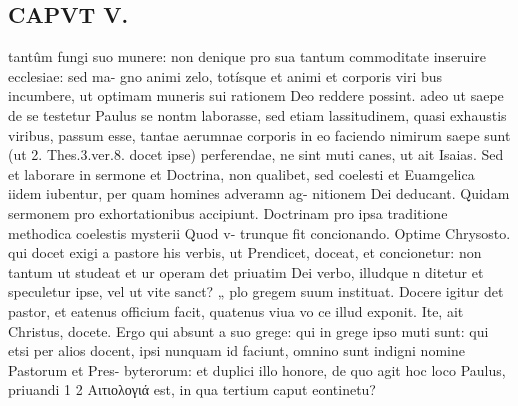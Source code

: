 \documentclass{article}
\begin{document}
\begin{pages}
\section*{CAPVT  V. }
\marginpar{[ p.309 ]}tantûm fungi suo munere: non denique pro sua tantum commoditate inseruire ecclesiae: sed ma- gno animi zelo, totísque et animi et corporis viri bus incumbere, ut optimam muneris sui rationem Deo reddere possint. adeo ut saepe de se testetur Paulus se nontm laborasse, sed etiam lassitudinem, quasi exhaustis viribus, passum esse, tantae aerumnae corporis in eo faciendo nimirum saepe sunt (ut 2. Thes.3.ver.8. docet ipse) perferendae, ne sint muti canes, ut ait Isaias. Sed et laborare in sermone et Doctrina, non qualibet, sed coelesti et Euamgelica iidem iubentur, per quam homines adveramn ag- nitionem Dei deducant. Quidam sermonem pro exhortationibus accipiunt. Doctrinam pro ipsa traditione methodica coelestis mysterii Quod v- trunque fit concionando. Optime Chrysosto. qui docet exigi a pastore his verbis, ut Prendicet, doceat, et concionetur: non tantum ut studeat et ur operam det priuatim Dei verbo, illudque n ditetur et speculetur ipse, vel ut vite sanct? „ plo gregem suum instituat. Docere igitur det pastor, et eatenus officium facit, quatenus viua vo ce illud exponit. Ite, ait Christus, docete. Ergo qui absunt a suo grege: qui in grege ipso muti sunt: qui etsi per alios docent, ipsi nunquam id faciunt, omnino sunt indigni nomine Pastorum et Pres- byterorum: et duplici illo honore, de quo agit hoc loco Paulus, priuandi    1 2 Αιτιολογιά est, in qua tertium caput eontinetu? 

\end{pages}
\end{document}
